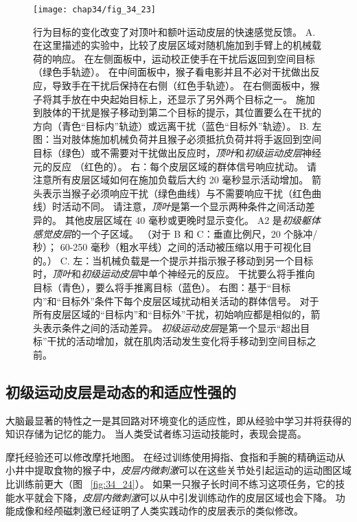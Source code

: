 \begin{figure}[htbp]
	\centering
	\texttt{[image: chap34/fig\_34\_23]}
	\caption{行为目标的变化改变了对顶叶和额叶运动皮层的快速感觉反馈。
		A. 在这里描述的实验中，比较了皮层区域对随机施加到手臂上的机械载荷的响应。
		在左侧面板中，运动校正使手在干扰后返回到空间目标（绿色手轨迹）。
		在中间面板中，猴子看电影并且不必对干扰做出反应，导致手在干扰后保持在右侧（红色手轨迹）。
		在右侧面板中，猴子将其手放在中央起始目标上，还显示了另外两个目标之一。
		施加到肢体的干扰是猴子移动到第二个目标的提示，其位置要么在干扰的方向（青色“目标内”轨迹）或远离干扰（蓝色“目标外”轨迹）。
		B. 左图：当对肢体施加机械负荷并且猴子必须抵抗负荷并将手返回到空间目标（绿色）或不需要对干扰做出反应时，\textit{顶叶}和\textit{初级运动皮层}神经元的反应 （红色的）。
		右：每个皮层区域的群体信号响应扰动。 请注意所有皮层区域如何在施加负载后大约 20 毫秒显示活动增加。
		箭头表示当猴子必须响应干扰（绿色曲线）与不需要响应干扰（红色曲线）时活动不同。
		请注意，\textit{顶叶}是第一个显示两种条件之间活动差异的。 
		其他皮层区域在 40 毫秒或更晚时显示变化。
		A2 是\textit{初级躯体感觉皮层}的一个子区域。 （对于 B 和 C：垂直比例尺，20 个脉冲/秒）；
		60-250 毫秒（粗水平线）之间的活动被压缩以用于可视化目的。）
		C. 左：当机械负载是一个提示并指示猴子移动到另一个目标时，\textit{顶叶}和\textit{初级运动皮层}中单个神经元的反应。
		干扰要么将手推向目标（青色），要么将手推离目标（蓝色）。
		右图：基于“目标内”和“目标外”条件下每个皮层区域扰动相关活动的群体信号。
		对于所有皮层区域的“目标内”和“目标外”干扰，初始响应都是相似的，箭头表示条件之间的活动差异。
		\textit{初级运动皮层}是第一个显示“超出目标”干扰的活动增加，就在肌肉活动发生变化将手移动到空间目标之前。}
	\label{fig:34_23}
\end{figure}


\subsection{初级运动皮层是动态的和适应性强的}

大脑最显著的特性之一是其回路对环境变化的适应性，即从经验中学习并将获得的知识存储为记忆的能力。
当人类受试者练习运动技能时，表现会提高。


摩托经验还可以修改摩托地图。
在经过训练使用拇指、食指和手腕的精确运动从小井中提取食物的猴子中，\textit{皮层内微刺激}可以在这些关节处引起运动的运动图区域比训练前更大（图 ~\ref{fig:34_24}）。
如果一只猴子长时间不练习这项任务，它的技能水平就会下降，\textit{皮层内微刺激}可以从中引发训练动作的皮层区域也会下降。
功能成像和经颅磁刺激已经证明了人类实践动作的皮层表示的类似修改。


